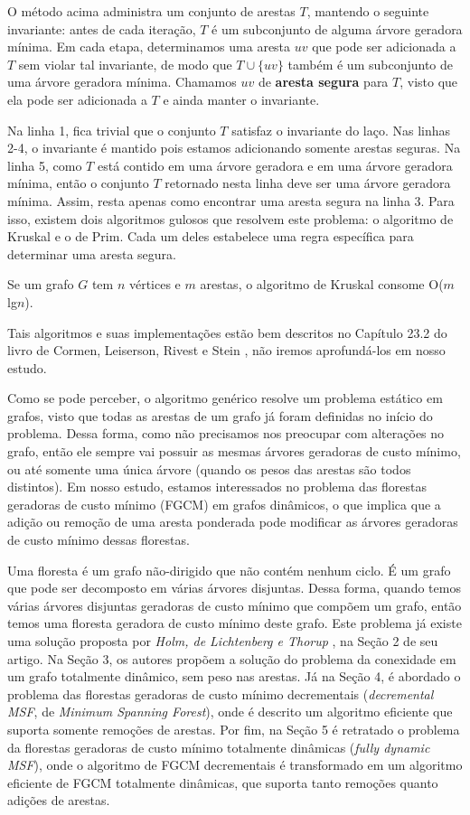 O método acima administra um conjunto de arestas $T$, mantendo o seguinte invariante: antes de cada iteração, $T$ é um subconjunto de alguma árvore geradora mínima. Em cada etapa, determinamos uma aresta $uv$ que pode ser adicionada a $T$ sem violar tal invariante, de modo que $T \cup \{uv\}$ também é um subconjunto de uma árvore geradora mínima. Chamamos $uv$ de \textbf{aresta segura} para $T$, visto que ela pode ser adicionada a $T$ e ainda manter o invariante. 

Na linha 1, fica trivial que o conjunto $T$ satisfaz o invariante do laço. Nas linhas 2-4, o invariante é mantido pois estamos adicionando somente arestas seguras. Na linha 5, como $T$ está contido em uma árvore geradora e em uma árvore geradora mínima, então o conjunto $T$ retornado nesta linha deve ser uma árvore geradora mínima. Assim, resta apenas como encontrar uma aresta segura na linha 3. Para isso, existem dois algoritmos gulosos que resolvem este problema: o algoritmo de Kruskal e o de Prim. Cada um deles estabelece uma regra específica para determinar uma aresta segura.

Se um grafo $G$ tem $n$ vértices e $m$ arestas, o algoritmo de Kruskal consome O($m$lg$n$).


Tais algoritmos e suas implementações estão bem descritos no Capítulo 23.2 do livro de Cormen, Leiserson, Rivest e Stein \cite{clrs}, não iremos aprofundá-los em nosso estudo. 



Como se pode perceber, o algoritmo genérico resolve um problema estático em grafos, visto que todas as arestas de um grafo já foram definidas no início do problema. Dessa forma, como não precisamos nos preocupar com alterações no grafo, então ele sempre vai possuir as mesmas árvores geradoras de custo mínimo, ou até somente uma única árvore (quando os pesos das arestas são todos distintos). Em nosso estudo, estamos interessados no problema das florestas geradoras de custo mínimo (FGCM) em grafos dinâmicos, o que implica que a adição ou remoção de uma aresta ponderada pode modificar as árvores geradoras de custo mínimo dessas florestas.

Uma floresta é um grafo não-dirigido que não contém nenhum ciclo. É um grafo que pode ser decomposto em várias árvores disjuntas. Dessa forma, quando temos várias árvores disjuntas geradoras de custo mínimo que compõem um grafo, então temos uma floresta geradora de custo mínimo deste grafo. Este problema já existe uma solução proposta por \textit{Holm, de Lichtenberg e Thorup} \cite{jacob_holm}, na Seção 2 de seu artigo. Na Seção 3, os autores propõem a solução do problema da conexidade em um grafo totalmente dinâmico, sem peso nas arestas. Já na Seção 4, é abordado o problema das florestas geradoras de custo mínimo decrementais (\textit{decremental MSF}, de \textit{Minimum Spanning Forest}), onde é descrito um algoritmo eficiente que suporta somente remoções de arestas. Por fim, na Seção 5 é retratado o problema da florestas geradoras de custo mínimo totalmente dinâmicas (\textit{fully dynamic MSF}), onde o algoritmo de FGCM decrementais é transformado em um algoritmo eficiente de FGCM totalmente dinâmicas, que suporta tanto remoções quanto adições de arestas.

